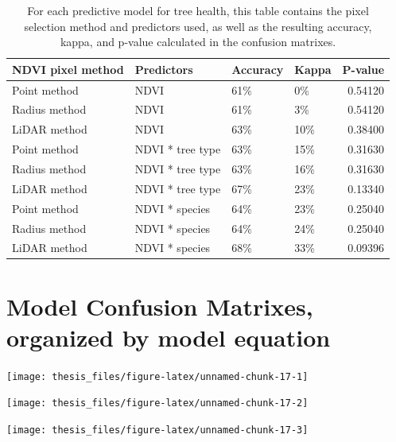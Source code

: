 \documentclass[12pt,twoside]{reedthesis}
\begin{document}
\begin{longtable}[t]{llllr}
\caption[Summary of results from various predictive models]{\label{tab:model-table}For each predictive model for tree health, this table contains the pixel selection method and predictors used, as well as the resulting accuracy, kappa, and p-value calculated in the confusion matrixes.}\\
\toprule
NDVI pixel method & Predictors & Accuracy & Kappa & P-value\\
\midrule
Point method & NDVI & 61\% & 0\% & 0.54120\\
Radius method & NDVI & 61\% & 3\% & 0.54120\\
LiDAR method & NDVI & 63\% & 10\% & 0.38400\\
Point method & NDVI * tree type & 63\% & 15\% & 0.31630\\
Radius method & NDVI * tree type & 63\% & 16\% & 0.31630\\
\addlinespace
LiDAR method & NDVI * tree type & 67\% & 23\% & 0.13340\\
Point method & NDVI * species & 64\% & 23\% & 0.25040\\
Radius method & NDVI * species & 64\% & 24\% & 0.25040\\
LiDAR method & NDVI * species & 68\% & 33\% & 0.09396\\
\bottomrule
\end{longtable}
\hypertarget{model-confusion-matrixes-organized-by-model-equation}{%
\section{Model Confusion Matrixes, organized by model equation}\label{model-confusion-matrixes-organized-by-model-equation}}
\begin{center}\texttt{[image: thesis\_files/figure-latex/unnamed-chunk-17-1]} \end{center}
\begin{center}\texttt{[image: thesis\_files/figure-latex/unnamed-chunk-17-2]} \end{center}
\begin{center}\texttt{[image: thesis\_files/figure-latex/unnamed-chunk-17-3]} \end{center}
\end{document}
